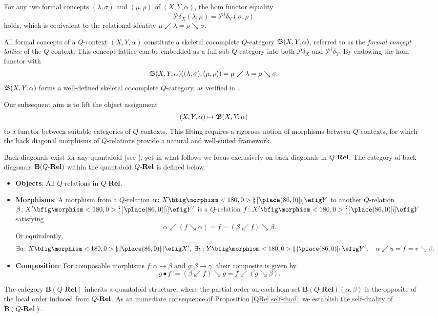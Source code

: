 \documentclass{tac}
\begin{document}
For any two formal concepts $(\lambda,\sigma)$ and $(\mu,\rho)$ of $(X,Y,\alpha)$, the hom functor equality
\[
\mathcal{P}\delta_X(\lambda,\mu)=\mathcal{P}^\dagger\delta_Y(\sigma,\rho)
\]
holds, which is equivalent to the relational identity $\mu\swarrow\lambda=\rho\searrow\sigma$.

All formal concepts of a $Q$-context $(X,Y,\alpha)$ constitute a skeletal cocomplete $Q$-category $\mathfrak{B}(X,Y,\alpha)$, referred to as the \emph{formal concept lattice} of the $Q$-context. This concept lattice can be embedded as a full sub-$Q$-category into both $\mathcal{P}\delta_X$ and $\mathcal{P}^\dagger\delta_Y$. By endowing the hom functor with
\[
\mathfrak{B}(X,Y,\alpha)((\lambda,\sigma),(\mu,\rho))=\mu\swarrow\lambda=\rho\searrow\sigma,
\]
$\mathfrak{B}(X,Y,\alpha)$ forms a well-defined skeletal cocomplete $Q$-category, as verified in \cite{Belohlavek2002,LaiZhang2009}.

Our subsequent aim is to lift the object assignment $$(X,Y,\alpha)\mapsto\mathfrak{B}(X,Y,\alpha)$$ to a functor between suitable categories of $Q$-contexts. This lifting requires a rigorous notion of morphisms between $Q$-contexts, for which the back diagonal morphisms of $Q$-relations provide a natural and well-suited framework.

Back diagonals exist for any quantaloid (see \cite{ShenTaoZhang2016}), yet in what follows we focus exclusively on back diagonals in \(Q\text{-}\mathbf{Rel}\). The category of back diagonals \({\mathbf{B}(Q\text{-}\mathbf{Rel})}\) within the quantaloid \(Q\text{-}\mathbf{Rel}\) is defined below:
\begin{itemize}
\item \textbf{Objects}: All $Q$-relations in $Q\text{-}\mathbf{Rel}$.
\item \textbf{Morphisms}: A morphism from a $Q$-relation $\alpha\colon X\nto Y$ to another $Q$-relation $\beta\colon X'\nto Y'$ is a $Q$-relation $f\colon X'\nto Y$ satisfying
\[
\alpha\swarrow(f\searrow\alpha)=f=(\beta\swarrow f)\searrow\beta.
\]
Or equivalently, 
\[
\exists u\colon X\nto X',\ \exists v\colon Y\nto Y',\quad \alpha\swarrow u=f=v\searrow\beta.
\]
\item \textbf{Composition}: For composable morphisms $f\colon\alpha\to\beta$ and $g\colon\beta\to\gamma$, their composite is given by
\[
g\bullet f:=(\beta\swarrow f)\searrow g=f\swarrow(g\searrow\beta).
\]
\end{itemize}

The category $\mathbf{B}(Q\text{-}\mathbf{Rel})$ inherits a quantaloid structure, where the partial order on each hom-set $\mathbf{B}(Q\text{-}\mathbf{Rel})(\alpha,\beta)$ is the opposite of the local order induced from $Q\text{-}\mathbf{Rel}$. As an immediate consequence of Proposition \ref{QRel self-dual}, we establish the self-duality of $\mathbf{B}(Q\text{-}\mathbf{Rel})$.
\end{document}
